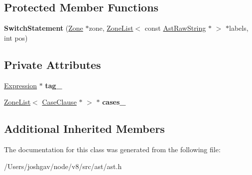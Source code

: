 \subsection*{Protected Member Functions}
\begin{DoxyCompactItemize}
\item 
{\bfseries Switch\+Statement} (\hyperlink{classv8_1_1internal_1_1_zone}{Zone} $\ast$zone, \hyperlink{classv8_1_1internal_1_1_zone_list}{Zone\+List}$<$ const \hyperlink{classv8_1_1internal_1_1_ast_raw_string}{Ast\+Raw\+String} $\ast$ $>$ $\ast$labels, int pos)\hypertarget{classv8_1_1internal_1_1_switch_statement_a43d42d4e276d9eb114cfb97d52c8d8ca}{}\label{classv8_1_1internal_1_1_switch_statement_a43d42d4e276d9eb114cfb97d52c8d8ca}

\end{DoxyCompactItemize}
\subsection*{Private Attributes}
\begin{DoxyCompactItemize}
\item 
\hyperlink{classv8_1_1internal_1_1_expression}{Expression} $\ast$ {\bfseries tag\+\_\+}\hypertarget{classv8_1_1internal_1_1_switch_statement_aa39809dbd15c9dac0e9192ab3587648e}{}\label{classv8_1_1internal_1_1_switch_statement_aa39809dbd15c9dac0e9192ab3587648e}

\item 
\hyperlink{classv8_1_1internal_1_1_zone_list}{Zone\+List}$<$ \hyperlink{classv8_1_1internal_1_1_case_clause}{Case\+Clause} $\ast$ $>$ $\ast$ {\bfseries cases\+\_\+}\hypertarget{classv8_1_1internal_1_1_switch_statement_a2b1df991f730db6c42605bfa9f327757}{}\label{classv8_1_1internal_1_1_switch_statement_a2b1df991f730db6c42605bfa9f327757}

\end{DoxyCompactItemize}
\subsection*{Additional Inherited Members}


The documentation for this class was generated from the following file\+:\begin{DoxyCompactItemize}
\item 
/\+Users/joshgav/node/v8/src/ast/ast.\+h\end{DoxyCompactItemize}
